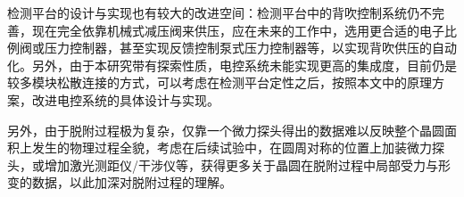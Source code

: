 检测平台的设计与实现也有较大的改进空间：检测平台中的背吹控制系统仍不完善，现在完全依靠机械式减压阀来供压，应在未来的工作中，选用更合适的电子比例阀或压力控制器，甚至实现反馈控制泵式压力控制器等，以实现背吹供压的自动化。另外，由于本研究带有探索性质，电控系统未能实现更高的集成度，目前仍是较多模块松散连接的方式，可以考虑在检测平台定性之后，按照本文中的原理方案，改进电控系统的具体设计与实现。

另外，由于脱附过程极为复杂，仅靠一个微力探头得出的数据难以反映整个晶圆面积上发生的物理过程全貌，考虑在后续试验中，在圆周对称的位置上加装微力探头，或增加激光测距仪/干涉仪等，获得更多关于晶圆在脱附过程中局部受力与形变的数据，以此加深对脱附过程的理解。